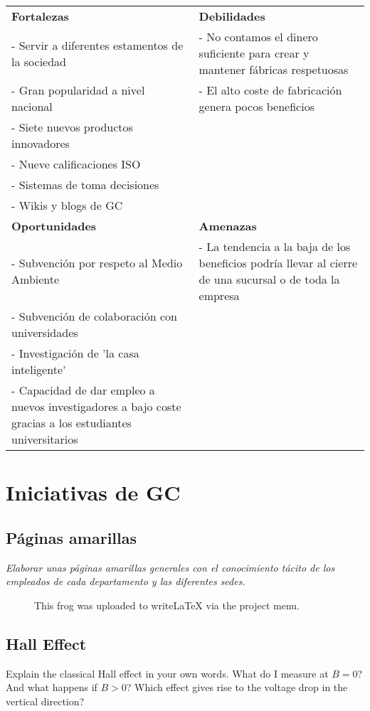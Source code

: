\documentclass[a4paper]{article}
\begin{document}
\begin{table}[ht!]
	\centering
	\begin{tabular}{p{6cm}|p{6cm}}
		\textbf{Fortalezas} & \textbf{Debilidades}\\
		- Servir a diferentes estamentos de la sociedad & - No contamos el dinero suficiente para crear y mantener fábricas respetuosas \\
		- Gran popularidad a nivel nacional & - El alto coste de fabricación genera pocos beneficios \\
		- Siete nuevos productos innovadores & \\
		- Nueve calificaciones ISO & \\
		- Sistemas de toma decisiones & \\
		- Wikis y blogs de GC & \\\hline
		\textbf{Oportunidades} & \textbf{Amenazas} \\
		- Subvención por respeto al Medio Ambiente & - La tendencia a la baja de los beneficios podría llevar al cierre de una sucursal o de toda la empresa\\
		- Subvención de colaboración con universidades & \\
		- Investigación de 'la casa inteligente' & \\
		- Capacidad de dar empleo a nuevos investigadores a bajo coste gracias a los estudiantes universitarios
	\end{tabular}
\end{table}

\section{Iniciativas de GC}

\subsection{Páginas amarillas}

\textit{Elaborar unas páginas amarillas generales con el conocimiento tácito de los empleados de cada departamento y las diferentes sedes.}

\begin{figure}[ht!]
	\centering
	\caption{\label{fig:frog}This frog was uploaded to writeLaTeX via the project menu.}{}
\end{figure}

\subsection{Hall Effect}
Explain the classical Hall effect in your own words. What do I measure at $B=0$? And what happens if $B>0$? Which effect gives rise to the voltage drop in the vertical direction?
\end{document}
